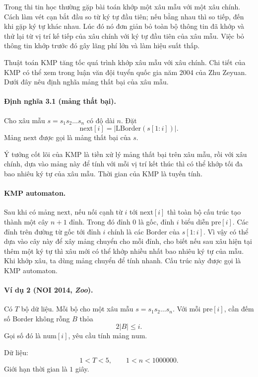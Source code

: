 \documentclass[11pt]{article}
\begin{document}
Trong thi tin học thường gặp bài toán khớp một xâu mẫu với một xâu chính. Cách
làm vét cạn bắt đầu so từ ký tự đầu tiên; nếu bằng nhau thì so tiếp, đến khi
gặp ký tự khác nhau. Lúc đó nó đơn giản bỏ toàn bộ thông tin đã khớp và thử lại
từ vị trí kế tiếp của xâu chính với ký tự đầu tiên của xâu mẫu. Việc bỏ thông
tin khớp trước đó gây lãng phí lớn và làm hiệu suất thấp.

Thuật toán KMP tăng tốc quá trình khớp xâu mẫu với xâu chính. Chi tiết của KMP
có thể xem trong luận văn đội tuyển quốc gia năm 2004 của Zhu Zeyuan. Dưới đây
nêu định nghĩa mảng thất bại của xâu mẫu.

\paragraph{Định nghĩa 3.1 (mảng thất bại).}
Cho xâu mẫu \(s=s_1s_2\ldots s_n\) có độ dài \(n\). Đặt
\[
  \mathrm{next}[i]=|\mathrm{LBorder}(s[1:i])|.
\]
Mảng \(\mathrm{next}\) được gọi là mảng thất bại của \(s\).

Ý tưởng cốt lõi của KMP là tiền xử lý mảng thất bại trên xâu mẫu, rồi với xâu
chính, dựa vào mảng này để tính với mỗi vị trí kết thúc thì có thể khớp tối đa
bao nhiêu ký tự của xâu mẫu. Thời gian của KMP là tuyến tính.

\paragraph{KMP automaton.}
Sau khi có mảng \(\mathrm{next}\), nếu nối cạnh từ \(i\) tới \(\mathrm{next}[i]\)
thì toàn bộ cấu trúc tạo thành một cây \(n+1\) đỉnh. Trong đó đỉnh \(0\) là gốc,
đỉnh \(i\) biểu diễn \(\mathrm{pre}[i]\). Các đỉnh trên đường từ gốc tới đỉnh
\(i\) chính là các Border của \(s[1:i]\). Vì vậy có thể dựa vào cây này để xây
mảng chuyển cho mỗi đỉnh, cho biết nếu sau xâu hiện tại thêm một ký tự thì xâu
mới có thể khớp nhiều nhất bao nhiêu ký tự của mẫu. Khi khớp xâu, ta dùng mảng
chuyển để tính nhanh. Cấu trúc này được gọi là KMP automaton.

\paragraph{Ví dụ 2 (NOI 2014, \emph{Zoo}).}
Có \(T\) bộ dữ liệu. Mỗi bộ cho một xâu mẫu \(s=s_1s_2\ldots s_n\). Với mỗi
\(\mathrm{pre}[i]\), cần đếm số Border không rỗng \(B\) thỏa
\[
  2|B|\le i.
\]
Gọi số đó là \(\mathrm{num}[i]\), yêu cầu tính mảng \(\mathrm{num}\).

Dữ liệu:
\[
  1<T<5,\qquad 1<n<1000000.
\]
Giới hạn thời gian là \(1\) giây.
\end{document}
